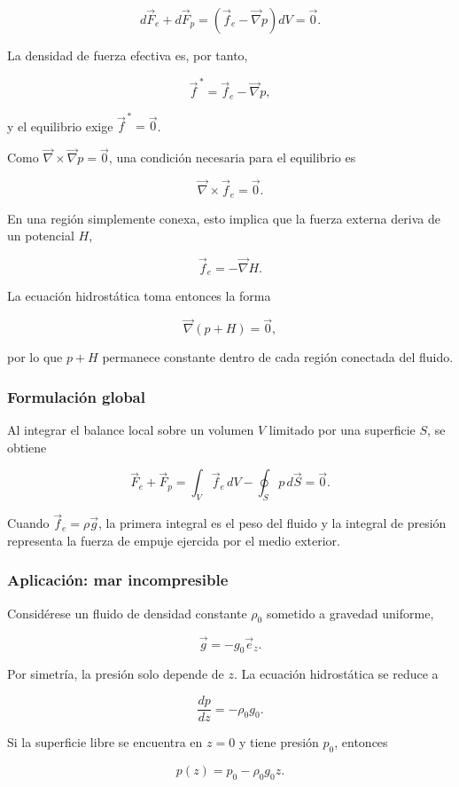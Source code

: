 $$
d\vec{F}_e+d\vec{F}_p
=\left(\vec{f}_e-\vec{\nabla}p\right)dV
=\vec{0}.
$$

La densidad de fuerza efectiva es, por tanto,

$$
\vec{f}^{\,*}=\vec{f}_e-\vec{\nabla}p,
$$

y el equilibrio exige $\vec{f}^{\,*}=\vec{0}$.

Como $\vec{\nabla}\times\vec{\nabla}p=\vec{0}$, una condición necesaria para
el equilibrio es

$$
\vec{\nabla}\times\vec{f}_e=\vec{0}.
$$

En una región simplemente conexa, esto implica que la fuerza externa deriva
de un potencial $H$,

$$
\vec{f}_e=-\vec{\nabla}H.
$$

La ecuación hidrostática toma entonces la forma

$$
\vec{\nabla}(p+H)=\vec{0},
$$

por lo que $p+H$ permanece constante dentro de cada región conectada del
fluido.

\subsubsection{Formulación global}

Al integrar el balance local sobre un volumen $V$ limitado por una superficie
$S$, se obtiene

$$
\boxed{
\vec{F}_e+\vec{F}_p
=\int_V\vec{f}_e\,dV
-\oint_Sp\,d\vec{S}
=\vec{0}
}.
$$

Cuando $\vec{f}_e=\rho\vec{g}$, la primera integral es el peso del fluido y la
integral de presión representa la fuerza de empuje ejercida por el medio
exterior.

\subsubsection{Aplicación: mar incompresible}

Considérese un fluido de densidad constante $\rho_0$ sometido a gravedad
uniforme,

$$
\vec{g}=-g_0\vec{e}_z.
$$

Por simetría, la presión solo depende de $z$. La ecuación hidrostática se
reduce a

$$
\frac{dp}{dz}=-\rho_0g_0.
$$

Si la superficie libre se encuentra en $z=0$ y tiene presión $p_0$, entonces

$$
\boxed{
p(z)=p_0-\rho_0g_0z
}.
$$

